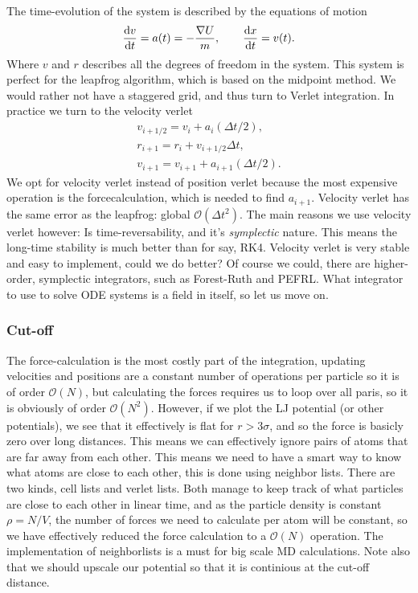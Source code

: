 \documentclass[a4paper, 11pt, notitlepage, english]{article}
\renewcommand{\d}{{\rm d}}
\begin{document}
The time-evolution of the system is described by the equations of motion
$$\frac{\d v}{\d t} = a(t) = -\frac{\nabla U}{m}, \qquad \frac{\d x}{\d t} = v(t).$$
Where $v$ and $r$ describes all the degrees of freedom in the system. This system is perfect for the leapfrog algorithm, which is based on the midpoint method. We would rather not have a staggered grid, and thus turn to Verlet integration. In practice we turn to the velocity verlet 
\begin{align*}
v_{i+1/2} = v_i + a_i (\Delta t /2), \\
r_{i+1} = r_i + v_{i+1/2} \Delta t, \\
v_{i+1} = v_{i+1} + a_{i+1} (\Delta t /2).
\end{align*}
We opt for velocity verlet instead of position verlet because the most expensive operation is the forcecalculation, which is needed to find $a_{i+1}$. Velocity verlet has the same error as the leapfrog: global $\mathcal{O}(\Delta t^2)$. The main reasons we use velocity verlet however: Is time-reversability, and it's \emph{symplectic} nature. This means the long-time stability is much better than for say, RK4. Velocity verlet is very stable and easy to implement, could we do better? Of course we could, there are higher-order, symplectic integrators, such as Forest-Ruth and PEFRL. What integrator to use to solve ODE systems is a field in itself, so let us move on.

\subsubsection*{Cut-off}
The force-calculation is the most costly part of the integration, updating velocities and positions are a constant number of operations per particle so it is of order $\mathcal{O}(N)$, but calculating the forces requires us to loop over all paris, so it is obviously of order $\mathcal{O}(N^2)$. However, if we plot the LJ potential (or other potentials), we see that it effectively is flat for $r > 3\sigma$, and so the force is basicly zero over long distances. This means we can effectively ignore pairs of atoms that are far away from each other. This means we need to have a smart way to know what atoms are close to each other, this is done using neighbor lists. There are two kinds, cell lists and verlet lists. Both manage to keep track of what particles are close to each other in linear time, and as the particle density is constant $\rho = N/V$, the number of forces we need to calculate per atom will be constant, so we have effectively reduced the force calculation to a $\mathcal{O}(N)$ operation. The implementation of neighborlists is a must for big scale MD calculations. Note also that we should upscale our potential so that it is continious at the cut-off distance.
\end{document}
